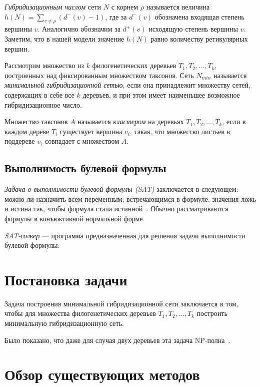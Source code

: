 \emph{Гибридизационным числом} сети $N$ с корнем $\rho$ называется величина $h(N) = \sum\limits_{v \ne \rho} (d^-(v) - 1)$, где за $d^-(v)$ обозначена входящая степень вершины $v$.
Аналогично обозначим за $d^+(v)$ исходящую степень вершины $v$.
Заметим, что в нашей модели значение $h(N)$ равно количеству ретикулярных вершин.

Рассмотрим множество из $k$ филогенетических деревьев $T_1, T_2, \dots, T_k$, построенных над фиксированным множеством таксонов.
Сеть $N_{min}$ называется \emph{минимальной гибридизационной сетью}, если она принадлежит множеству сетей, содержащих в себе все $k$ деревьев, и при этом имеет наименьшее возможное гибридизационное число.

Множество таксонов $A$ называется \emph{кластером} на деревьях $T_1, T_2, \dots, T_k$, если в каждом дереве $T_i$ существует вершина $v_i$, такая, что множество листьев в поддереве $v_i$ совпадает с множеством $A$.

\subsection{Выполнимость булевой формулы}

\emph{Задача о выполнимости булевой формулы (SAT)} заключается в следующем: можно ли назначить всем переменным, встречающимся в формуле, значения ложь и истина так, чтобы формула стала истинной~\cite{wiki:sat}. Обычно рассматриваются формулы в конъюктивной нормальной форме.

\emph{SAT-солвер} --- программа предназначенная для решения задачи выполнимости булевой формулы.

\FloatBarrier
\section{Постановка задачи}

Задача построения минимальной гибридизационной сети заключается в том, чтобы для множества филогенетических деревьев $T_1, T_2, \dots, T_k$ построить минимальную гибридизационную сеть.

Было показано, что даже для случая двух деревьев эта задача NP-полна~\cite {bordewich2007computing}.

\FloatBarrier
\section{Обзор существующих методов}
